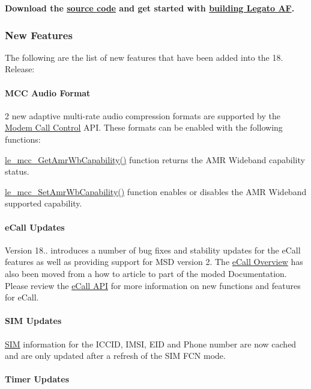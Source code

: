 {\bfseries  Download the \hyperlink{aboutReleaseInfo}{source code} and get started with \hyperlink{basicBuild}{building Legato AF}. }\hypertarget{releaseNotes18030_rn1803_Features}{}\subsubsection{New Features}\label{releaseNotes18030_rn1803_Features}
The following are the list of new features that have been added into the 18. Release\+:\hypertarget{releaseNotes18030_rn1803_Features_Audio}{}\paragraph{M\+C\+C Audio Format}\label{releaseNotes18030_rn1803_Features_Audio}
2 new adaptive multi-\/rate audio compression formats are supported by the \hyperlink{c_mcc}{Modem Call Control} A\+PI. These formats can be enabled with the following functions\+:
\begin{DoxyItemize}
\item \hyperlink{le__mcc__interface_8h_a3762311b9860dc66c52b00f4324dc140}{le\+\_\+mcc\+\_\+\+Get\+Amr\+Wb\+Capability()} function returns the A\+MR Wideband capability status.
\item \hyperlink{le__mcc__interface_8h_ab2df0040963d964f360cb2b7148f9277}{le\+\_\+mcc\+\_\+\+Set\+Amr\+Wb\+Capability()} function enables or disables the A\+MR Wideband supported capability.
\end{DoxyItemize}\hypertarget{releaseNotes18030_rn1803_Features_eCall}{}\paragraph{e\+Call Updates}\label{releaseNotes18030_rn1803_Features_eCall}
Version 18.. introduces a number of bug fixes and stability updates for the e\+Call features as well as providing support for M\+SD version 2. The \hyperlink{legatoServicesModemECall}{e\+Call Overview} has also been moved from a how to article to part of the moded Documentation. Please review the \hyperlink{c_ecall}{e\+Call A\+PI} for more information on new functions and features for e\+Call.\hypertarget{releaseNotes18030_rn1803_Features_SIM}{}\paragraph{S\+I\+M Updates}\label{releaseNotes18030_rn1803_Features_SIM}
\hyperlink{c_sim}{S\+IM} information for the I\+C\+C\+ID, I\+M\+SI, E\+ID and Phone number are now cached and are only updated after a refresh of the S\+IM F\+CN mode.\hypertarget{releaseNotes18030_rn1803_Features_Timer}{}\paragraph{Timer Updates}\label{releaseNotes18030_rn1803_Features_Timer}
